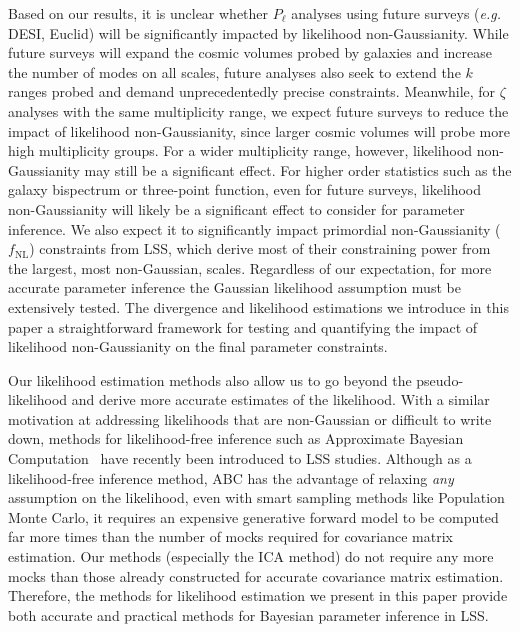 \documentclass[12pt, letterpaper, preprint]{aastex}
\newcommand{\lss}{{\small{LSS}}\xspace}
\newcommand{\ica}{{\small{ICA}}\xspace}
\begin{document}
Based on our results, it is unclear whether $P_\ell$ analyses using future 
surveys (\emph{e.g.} DESI, Euclid) will be significantly impacted by 
likelihood non-Gaussianity. While future surveys will expand the cosmic
volumes probed by galaxies and increase the number of modes on all scales, 
future analyses also seek to extend the $k$ ranges probed and demand
unprecedentedly precise constraints. Meanwhile, for $\zeta$ analyses with
the same multiplicity range, we expect future surveys to reduce the impact of
likelihood non-Gaussianity, since larger cosmic volumes will probe more
high multiplicity groups. For a wider multiplicity range, however, likelihood
non-Gaussianity may still be a significant effect. For higher order statistics
such as the galaxy bispectrum or three-point function, even for future surveys,
likelihood non-Gaussianity will likely be a significant effect to consider for
parameter inference. We also expect it to significantly impact primordial non-Gaussianity
($f_\mathrm{NL}$) constraints from \lss, which derive most of their constraining
power from the largest, most non-Gaussian, scales. Regardless of our expectation,
for more accurate parameter inference the Gaussian likelihood assumption must
be extensively tested. The divergence and likelihood estimations we introduce in 
this paper a straightforward framework for testing and quantifying the 
impact of likelihood non-Gaussianity on the final parameter constraints. 

Our likelihood estimation methods also allow us to go beyond the pseudo-likelihood 
and derive more accurate estimates of the likelihood. With a similar 
motivation at addressing likelihoods that are non-Gaussian or difficult to 
write down, methods for likelihood-free inference such as Approximate Bayesian 
Computation~\citep[ABC;][]{hahn2017b,kacprzak2017,alsing2018} have recently 
been introduced to \lss studies. 
Although as a likelihood-free inference method, ABC has the advantage 
of relaxing \emph{any} assumption on the likelihood, even with smart sampling methods 
like Population Monte Carlo, it requires an expensive generative forward 
model to be computed far more times than the number of mocks required for 
covariance matrix estimation. Our methods (especially the \ica method)
do not require any more mocks than those already constructed for accurate covariance
matrix estimation. Therefore, the methods for likelihood estimation we present
in this paper provide both accurate and practical methods for Bayesian 
parameter inference in \lss. 
\end{document}
